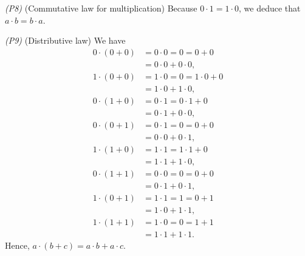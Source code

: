 \bigskip \emph{(P8)} (Commutative law for multiplication) \enspace Because $0 \cdot 1 = 1 \cdot 0$, we deduce that $a \cdot b = b \cdot a$.

\bigskip \emph{(P9)} (Distributive law) \enspace We have
\begin{align*}
	0 \cdot (0 + 0) & = 0 \cdot 0 = 0 = 0 + 0         \\
	                & = 0 \cdot 0 + 0 \cdot 0,        \\
	1 \cdot (0 + 0) & = 1 \cdot 0 = 0 = 1 \cdot 0 + 0 \\
	                & = 1 \cdot 0 + 1 \cdot 0,        \\
	0 \cdot (1 + 0) & = 0 \cdot 1 = 0 \cdot 1 + 0     \\
	                & = 0 \cdot 1 + 0 \cdot 0,        \\
	0 \cdot (0 + 1) & = 0 \cdot 1 = 0 = 0 + 0         \\
	                & = 0 \cdot 0 + 0 \cdot 1,        \\
	1 \cdot (1 + 0) & = 1 \cdot 1 = 1 \cdot 1 + 0     \\
	                & = 1 \cdot 1 + 1 \cdot 0,        \\
	0 \cdot (1 + 1) & = 0 \cdot 0 = 0 = 0 + 0         \\
	                & = 0 \cdot 1 + 0 \cdot 1,        \\
	1 \cdot (0 + 1) & = 1 \cdot 1 = 1 = 0 + 1         \\
	                & = 1 \cdot 0 + 1 \cdot 1,        \\
	1 \cdot (1 + 1) & = 1 \cdot 0 = 0 = 1 + 1         \\
	                & = 1 \cdot 1 + 1 \cdot 1.
\end{align*}
Hence, $a \cdot (b + c) = a \cdot b + a \cdot c$.